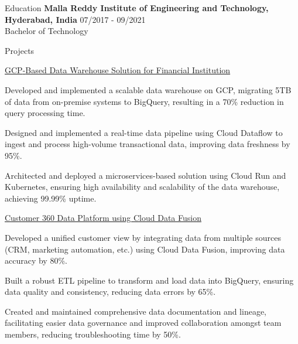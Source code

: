 \documentclass{resume} %
\begin{document}
\begin{rSection}{Education}
                        \textbf{Malla Reddy Institute of Engineering and Technology, Hyderabad, India} \hfill {07/2017 - 09/2021} \\
                            {Bachelor of Technology}
                         
             
         
    \end{rSection}

    \begin{rSection}{Projects}
                    \begin{rSubsection}
                                    {\href{https://example.com/project1}{GCP{-}Based Data Warehouse Solution for Financial Institution}}
                                {}{}{}
                                    \item Developed and implemented a scalable data warehouse on GCP, migrating 5TB of data from on{-}premise systems to BigQuery, resulting in a 70\% reduction in query processing time.
                                    \item Designed and implemented a real{-}time data pipeline using Cloud Dataflow to ingest and process high{-}volume transactional data, improving data freshness by 95\%.
                                    \item Architected and deployed a microservices{-}based solution using Cloud Run and Kubernetes, ensuring high availability and scalability of the data warehouse, achieving 99.99\% uptime.
                            \end{rSubsection}
                    \begin{rSubsection}
                                    {\href{https://example.com/project2}{Customer 360 Data Platform using Cloud Data Fusion}}
                                {}{}{}
                                    \item Developed a unified customer view by integrating data from multiple sources (CRM, marketing automation, etc.) using Cloud Data Fusion, improving data accuracy by 80\%.
                                    \item Built a robust ETL pipeline to transform and load data into BigQuery, ensuring data quality and consistency, reducing data errors by 65\%.
                                    \item Created and maintained comprehensive data documentation and lineage, facilitating easier data governance and improved collaboration amongst team members, reducing troubleshooting time by 50\%.

\end{rSubsection}
\end{rSection}
\end{document}
